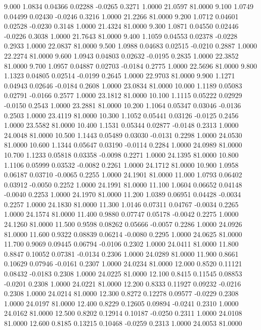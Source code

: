    9.000   1.0834   0.04366   0.02288  -0.0265   0.3271   1.0000  21.0597  81.0000
   9.100   1.0749   0.04499   0.02430  -0.0246   0.3216   1.0000  21.2266  81.0000
   9.200   1.0712   0.04601   0.02528  -0.0230   0.3148   1.0000  21.4324  81.0000
   9.300   1.0871   0.04550   0.02446  -0.0226   0.3038   1.0000  21.7643  81.0000
   9.400   1.1059   0.04553   0.02378  -0.0228   0.2933   1.0000  22.0837  81.0000
   9.500   1.0988   0.04683   0.02515  -0.0210   0.2887   1.0000  22.2274  81.0000
   9.600   1.0943   0.04803   0.02632  -0.0195   0.2835   1.0000  22.3852  81.0000
   9.700   1.0957   0.04887   0.02703  -0.0184   0.2775   1.0000  22.5696  81.0000
   9.800   1.1323   0.04805   0.02514  -0.0199   0.2645   1.0000  22.9703  81.0000
   9.900   1.1271   0.04943   0.02646  -0.0184   0.2608   1.0000  23.0834  81.0000
  10.000   1.1189   0.05083   0.02791  -0.0166   0.2577   1.0000  23.1812  81.0000
  10.100   1.1115   0.05222   0.02929  -0.0150   0.2543   1.0000  23.2881  81.0000
  10.200   1.1064   0.05347   0.03046  -0.0136   0.2503   1.0000  23.4119  81.0000
  10.300   1.1052   0.05441   0.03126  -0.0125   0.2456   1.0000  23.5582  81.0000
  10.400   1.1531   0.05344   0.02877  -0.0148   0.2313   1.0000  24.0048  81.0000
  10.500   1.1443   0.05489   0.03030  -0.0131   0.2298   1.0000  24.0530  81.0000
  10.600   1.1344   0.05647   0.03190  -0.0114   0.2284   1.0000  24.0989  81.0000
  10.700   1.1233   0.05818   0.03358  -0.0098   0.2271   1.0000  24.1395  81.0000
  10.800   1.1106   0.05999   0.03532  -0.0082   0.2261   1.0000  24.1712  81.0000
  10.900   1.0958   0.06187   0.03710  -0.0065   0.2255   1.0000  24.1901  81.0000
  11.000   1.0793   0.06402   0.03912  -0.0050   0.2252   1.0000  24.1991  81.0000
  11.100   1.0604   0.06652   0.04148  -0.0040   0.2253   1.0000  24.1970  81.0000
  11.200   1.0389   0.06951   0.04428  -0.0034   0.2257   1.0000  24.1830  81.0000
  11.300   1.0146   0.07311   0.04767  -0.0034   0.2265   1.0000  24.1574  81.0000
  11.400   0.9880   0.07747   0.05178  -0.0042   0.2275   1.0000  24.1260  81.0000
  11.500   0.9598   0.08262   0.05666  -0.0057   0.2286   1.0000  24.0926  81.0000
  11.600   0.9322   0.08839   0.06214  -0.0080   0.2295   1.0000  24.0625  81.0000
  11.700   0.9069   0.09445   0.06794  -0.0106   0.2302   1.0000  24.0411  81.0000
  11.800   0.8847   0.10052   0.07381  -0.0134   0.2306   1.0000  24.0289  81.0000
  11.900   0.8661   0.10629   0.07946  -0.0161   0.2307   1.0000  24.0234  81.0000
  12.000   0.8520   0.11121   0.08432  -0.0183   0.2308   1.0000  24.0225  81.0000
  12.100   0.8415   0.11545   0.08853  -0.0201   0.2308   1.0000  24.0221  81.0000
  12.200   0.8333   0.11927   0.09232  -0.0216   0.2308   1.0000  24.0214  81.0000
  12.300   0.8272   0.12278   0.09577  -0.0229   0.2308   1.0000  24.0197  81.0000
  12.400   0.8229   0.12605   0.09894  -0.0241   0.2310   1.0000  24.0162  81.0000
  12.500   0.8202   0.12914   0.10187  -0.0250   0.2311   1.0000  24.0108  81.0000
  12.600   0.8185   0.13215   0.10468  -0.0259   0.2313   1.0000  24.0053  81.0000
